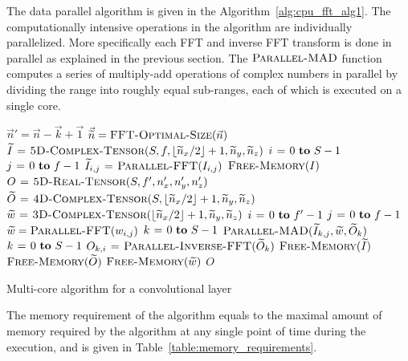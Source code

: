 \documentclass[conference]{IEEEtran}
\DeclarePairedDelimiter{\floor}{\lfloor}{\rfloor}
\begin{document}
  The data parallel algorithm is given in the
  Algorithm~\ref{alg:cpu_fft_alg1}.  The computationally intensive
  operations in the algorithm are individually parallelized.  More
  specifically each FFT and inverse FFT transform is done in parallel
  as explained in the previous section.  The $\textnormal{\scshape Parallel-MAD}$
  function computes a series of multiply-add operations of complex
  numbers in parallel by dividing the range into roughly equal
  sub-ranges, each of which is executed on a single core.

  \begin{algorithm}
    {\small
      \begin{codebox}
        \li $\vec{n}' = \vec{n} - \vec{k} + \vec{1}$
        \li $\vec{\widetilde{n}} = \textnormal{\scshape FFT-Optimal-Size}(\vec{n})$
        \li $\widetilde{I} \gets \proc{5D-Complex-Tensor}(S,f,\floor{\widetilde{n}_x/2}+1,\widetilde{n}_y,\widetilde{n}_z)$
        \li \For $i \gets 0 \To S-1$
        \li   \Do \For $j \gets 0 \To f-1$
        \li     \Do $\widetilde{I}_{i,j} \mathrel{\hspace{1pt}=\hspace{1pt}} \textnormal{\scshape Parallel-FFT}(I_{i,j})$
        \End \End
        \li $\textnormal{\scshape Free-Memory}(I)$
        \li $O \mathrel{\hspace{1pt}=\hspace{1pt}} \textnormal{\scshape5D-Real-Tensor}(S,f',n'_x,n'_y,n'_z)$
        \li $\widetilde{O} \gets \proc{4D-Complex-Tensor}(S,\floor{\widetilde{n}_x/2}+1,\widetilde{n}_y,\widetilde{n}_z)$
        \li $\widetilde{w} \gets \proc{3D-Complex-Tensor}(\floor{\widetilde{n}_x/2}+1,\widetilde{n}_y,\widetilde{n}_z)$
        \li \For $i \gets 0 \To f'-1$
        \li   \Do \For $j \gets 0 \To f-1$
        \li     \Do $\widetilde{w} = \textnormal{\scshape Parallel-FFT}(w_{i,j})$
        \li         \For $k \gets 0 \To S-1$
        \li           \Do $\textnormal{\scshape Parallel-MAD}(\widetilde{I}_{k,j}, \widetilde{w}, \widetilde{O}_{k})$
        \End \End
        \li   \For $k \gets 0 \To S-1$
        \li      \Do $O_{k,i} \mathrel{\hspace{1pt}=\hspace{1pt}} \textnormal{\scshape Parallel-Inverse-FFT}(\widetilde{O}_{k})$
        \End \End
        \li $\textnormal{\scshape Free-Memory}(\widetilde{I})$
        \li $\textnormal{\scshape Free-Memory}(\widetilde{O})$
        \li $\textnormal{\scshape Free-Memory}(\widetilde{w})$
        \li \Return $O$
      \end{codebox}
    }

    \caption{Multi-core algorithm for a convolutional layer}
    \label{alg:cpu_fft_alg1}
  \end{algorithm}

  The memory requirement of the algorithm equals to the maximal amount
  of memory required by the algorithm at any single point of time
  during the execution, and is given in
  Table~\ref{table:memory_requirements}.
\end{document}

